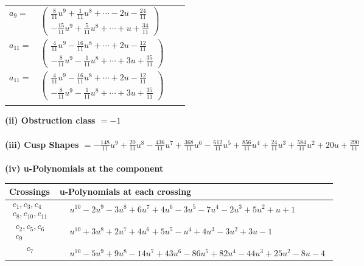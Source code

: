 \documentclass[1p]{elsarticle_modified}
\theoremstyle{definition}
\begin{document}
\begin{tabular}{m{7pt} m{180pt} m{7pt} m{180pt} }
\flushright $a_{9}=$&$\begin{pmatrix}\frac{8}{11} u^9+\frac{1}{11} u^8+\cdots-2 u-\frac{24}{11}\\-\frac{15}{11} u^9+\frac{5}{11} u^8+\cdots+u+\frac{34}{11}\end{pmatrix}$ \\
\flushright $a_{11}=$&$\begin{pmatrix}\frac{4}{11} u^9-\frac{16}{11} u^8+\cdots+2 u-\frac{12}{11}\\-\frac{8}{11} u^9-\frac{1}{11} u^8+\cdots+3 u+\frac{35}{11}\end{pmatrix}$\\ \flushright $a_{11}=$&$\begin{pmatrix}\frac{4}{11} u^9-\frac{16}{11} u^8+\cdots+2 u-\frac{12}{11}\\-\frac{8}{11} u^9-\frac{1}{11} u^8+\cdots+3 u+\frac{35}{11}\end{pmatrix}$\\&\end{tabular}
\flushleft \textbf{(ii) Obstruction class $= -1$}\\~\\
\flushleft \textbf{(iii) Cusp Shapes $= -\frac{148}{11} u^9+\frac{20}{11} u^8-\frac{436}{11} u^7+\frac{368}{11} u^6-\frac{612}{11} u^5+\frac{856}{11} u^4+\frac{24}{11} u^3+\frac{584}{11} u^2+20 u+\frac{290}{11}$}\\~\\
\newpage\renewcommand{\arraystretch}{1}
\flushleft \textbf{(iv) u-Polynomials at the component}\newline \\
\begin{tabular}{m{50pt}|m{274pt}}
Crossings & \hspace{64pt}u-Polynomials at each crossing \\
\hline $$\begin{aligned}c_{1},c_{3},c_{4}\\c_{8},c_{10},c_{11}\end{aligned}$$&$\begin{aligned}
&u^{10}-2 u^9-3 u^8+6 u^7+4 u^6-3 u^5-7 u^4-2 u^3+5 u^2+u+1
\end{aligned}$\\
\hline $$\begin{aligned}c_{2},c_{5},c_{6}\\c_{9}\end{aligned}$$&$\begin{aligned}
&u^{10}+3 u^8+2 u^7+4 u^6+5 u^5- u^4+4 u^3-3 u^2+3 u-1
\end{aligned}$\\
\hline $$\begin{aligned}c_{7}\end{aligned}$$&$\begin{aligned}
&u^{10}-5 u^9+9 u^8-14 u^7+43 u^6-86 u^5+82 u^4-44 u^3+25 u^2-8 u-4
\end{aligned}$\\
\hline
\end{tabular}\\~\\
\end{document}
